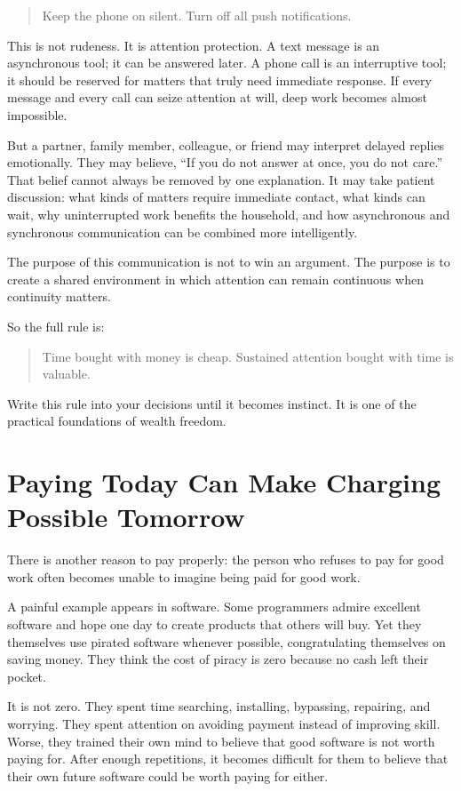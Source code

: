 \begin{quote}
Keep the phone on silent. Turn off all push notifications.
\end{quote}

This is not rudeness. It is attention protection. A text message is an asynchronous tool; it can be answered later. A phone call is an interruptive tool; it should be reserved for matters that truly need immediate response. If every message and every call can seize attention at will, deep work becomes almost impossible.

But a partner, family member, colleague, or friend may interpret delayed replies emotionally. They may believe, ``If you do not answer at once, you do not care.'' That belief cannot always be removed by one explanation. It may take patient discussion: what kinds of matters require immediate contact, what kinds can wait, why uninterrupted work benefits the household, and how asynchronous and synchronous communication can be combined more intelligently.

The purpose of this communication is not to win an argument. The purpose is to create a shared environment in which attention can remain continuous when continuity matters.

So the full rule is:

\begin{quote}
Time bought with money is cheap. Sustained attention bought with time is valuable.
\end{quote}

Write this rule into your decisions until it becomes instinct. It is one of the practical foundations of wealth freedom.

\section*{Paying Today Can Make Charging Possible Tomorrow}

There is another reason to pay properly: the person who refuses to pay for good work often becomes unable to imagine being paid for good work.

A painful example appears in software. Some programmers admire excellent software and hope one day to create products that others will buy. Yet they themselves use pirated software whenever possible, congratulating themselves on saving money. They think the cost of piracy is zero because no cash left their pocket.

It is not zero. They spent time searching, installing, bypassing, repairing, and worrying. They spent attention on avoiding payment instead of improving skill. Worse, they trained their own mind to believe that good software is not worth paying for. After enough repetitions, it becomes difficult for them to believe that their own future software could be worth paying for either.

